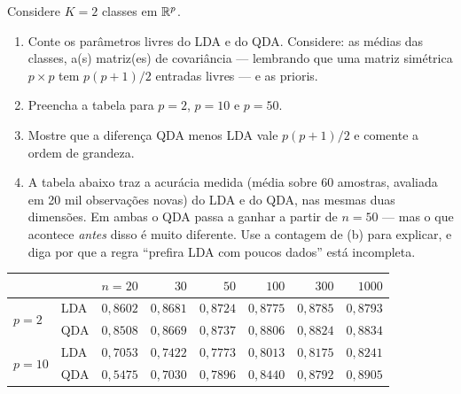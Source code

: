 \documentclass[11pt,a4paper]{article}
\begin{document}
\begin{exercicio}
Considere $K=2$ classes em $\mathbb{R}^p$.
\begin{enumerate}[label=(\alph*),leftmargin=1.1cm]
  \item Conte os parâmetros livres do LDA e do QDA. Considere: as médias das
        classes, a(s) matriz(es) de covariância --- lembrando que uma matriz
        simétrica $p\times p$ tem $p(p+1)/2$ entradas livres --- e as prioris.
  \item Preencha a tabela para $p=2$, $p=10$ e $p=50$.
  \item Mostre que a diferença QDA menos LDA vale $p(p+1)/2$ e comente a ordem de
        grandeza.
  \item A tabela abaixo traz a acurácia medida (média sobre 60 amostras, avaliada
        em 20 mil observações novas) do LDA e do QDA, nas mesmas duas dimensões.
        Em ambas o QDA passa a ganhar a partir de $n=50$ --- mas o que acontece
        \emph{antes} disso é muito diferente. Use a contagem de (b) para
        explicar, e diga por que a regra ``prefira LDA com poucos dados'' está
        incompleta.
\end{enumerate}

\begin{center}\small
\renewcommand{\arraystretch}{1.2}
\begin{tabular}{@{}llrrrrrr@{}}
\toprule
        &     & $n=20$ & $30$ & $50$ & $100$ & $300$ & $1000$ \\
\midrule
\multirow{2}{*}{$p=2$}  & LDA & $0{,}8602$ & $0{,}8681$ & $0{,}8724$ & $0{,}8775$ & $0{,}8785$ & $0{,}8793$ \\
                        & QDA & $0{,}8508$ & $0{,}8669$ & $0{,}8737$ & $0{,}8806$ & $0{,}8824$ & $0{,}8834$ \\
\midrule
\multirow{2}{*}{$p=10$} & LDA & $0{,}7053$ & $0{,}7422$ & $0{,}7773$ & $0{,}8013$ & $0{,}8175$ & $0{,}8241$ \\
                        & QDA & $0{,}5475$ & $0{,}7030$ & $0{,}7896$ & $0{,}8440$ & $0{,}8792$ & $0{,}8905$ \\
\bottomrule
\end{tabular}
\end{center}
\end{exercicio}
\end{document}
